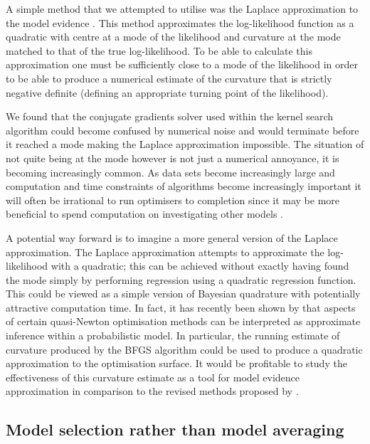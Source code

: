 A simple method that we attempted to utilise was the Laplace approximation to the model evidence \citep[e.g.][]{Bishop2006-yy}.
This method approximates the log-likelihood function as a quadratic with centre at a mode of the likelihood and curvature at the mode matched to that of the true log-likelihood.
To be able to calculate this approximation one must be sufficiently close to a mode of the likelihood in order to be able to produce a numerical estimate of the curvature that is strictly negative definite (\ie defining an appropriate turning point of the likelihood).

We found that the conjugate gradients solver used within the kernel search algorithm could become confused by numerical noise and would terminate before it reached a mode making the Laplace approximation impossible.
The situation of not quite being at the mode however is not just a numerical annoyance, it is becoming increasingly common.
As data sets become increasingly large and computation and time constraints of algorithms become increasingly important it will often be irrational to run optimisers to completion since it may be more beneficial to spend computation on investigating other models \citep[e.g.][]{Swersky2014-aw}.

A potential way forward is to imagine a more general version of the Laplace approximation.
The Laplace approximation attempts to approximate the log-likelihood with a quadratic; this can be achieved without exactly having found the mode simply by performing regression using a quadratic regression function.
This could be viewed as a simple version of Bayesian quadrature \citep[e.g.][]{Ghahramani2002-by, OHagan1991-wg} with potentially attractive computation time.
In fact, it has recently been shown by \citet{Hennig2012-wv} that aspects of certain quasi-Newton optimisation methods can be interpreted as approximate inference within a probabilistic model.
In particular, the running estimate of curvature produced by the BFGS algorithm could be used to produce a quadratic approximation to the optimisation surface.
It would be profitable to study the effectiveness of this curvature estimate as a tool for model evidence approximation in comparison to the revised methods proposed by \citet{Hennig2012-wv}.

\subsection{Model selection rather than model averaging}

